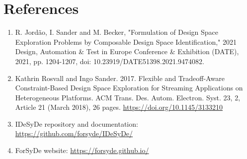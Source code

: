 \documentclass[12pt,notitlepage]{article}
\begin{document}
\section{References}
\begin{enumerate}
\item R. Jordão, I. Sander and M. Becker, "Formulation of Design Space Exploration Problems by Composable Design Space Identification," 2021 Design, Automation \& Test in Europe Conference \& Exhibition (DATE), 2021, pp. 1204-1207, doi: 10.23919/DATE51398.2021.9474082.
\item Kathrin Rosvall and Ingo Sander. 2017. Flexible and Tradeoff-Aware Constraint-Based Design Space Exploration for Streaming Applications on Heterogeneous Platforms. ACM Trans. Des. Autom. Electron. Syst. 23, 2, Article 21 (March 2018), 26 pages. \url{https://doi.org/10.1145/3133210}
\item IDeSyDe repository and documentation: \url{https://github.com/forsyde/IDeSyDe/}
\item ForSyDe website: \url{https://forsyde.github.io/}
\end{enumerate}
\end{document}
